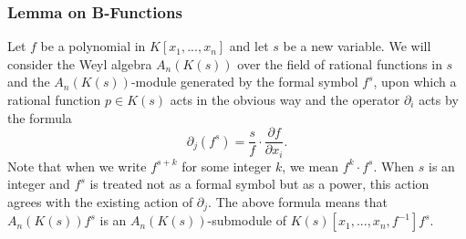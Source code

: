 \subsubsection{Lemma on B-Functions}
Let $f$ be a polynomial in $K[x_1,...,x_n]$ and let $s$ be a new variable. We will consider the Weyl algebra $A_n(K(s))$ over the field of rational functions in $s$ and the $A_n(K(s))$-module generated by the formal symbol $f^s$, upon which a rational function $p \in K(s)$ acts in the obvious way and the operator $\partial_i$ acts by the formula
\begin{equation}\label{eqn:formula-preceeding-b-func}
	\partial_j\left(f^s\right) = \frac{s}{f}\cdot \frac{\partial f}{\partial x_i}.
\end{equation}
Note that when we write $f^{s+k}$ for some integer $k$, we mean $f^k \cdot f^s$. When $s$ is an integer and $f^s$ is treated not as a formal symbol but as a power, this action agrees with the existing action of $\partial_j$. The above formula means that $A_n(K(s))f^s$ is an $A_n(K(s))$-submodule of $K(s)[x_1,...,x_n,f^{-1}]f^s$.

